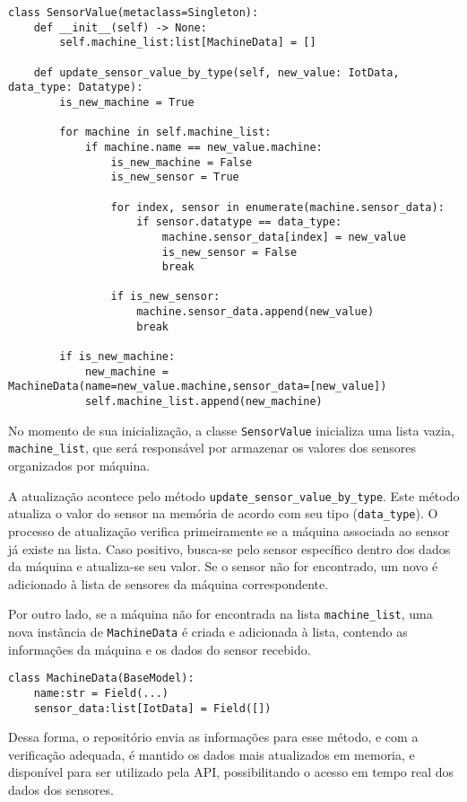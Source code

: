 \begin{verbatim}
class SensorValue(metaclass=Singleton):
    def __init__(self) -> None:
        self.machine_list:list[MachineData] = []

    def update_sensor_value_by_type(self, new_value: IotData, data_type: Datatype):
        is_new_machine = True

        for machine in self.machine_list:
            if machine.name == new_value.machine:
                is_new_machine = False
                is_new_sensor = True

                for index, sensor in enumerate(machine.sensor_data):
                    if sensor.datatype == data_type:
                        machine.sensor_data[index] = new_value
                        is_new_sensor = False
                        break

                if is_new_sensor:
                    machine.sensor_data.append(new_value)
                    break

        if is_new_machine:
            new_machine = MachineData(name=new_value.machine,sensor_data=[new_value])
            self.machine_list.append(new_machine)
\end{verbatim}

No momento de sua inicialização, a classe \texttt{SensorValue} inicializa uma lista vazia, \texttt{machine\_list}, que será responsável por armazenar os valores dos sensores organizados por máquina.

A atualização acontece pelo método \texttt{update\_sensor\_value\_by\_type}. Este método atualiza o valor do sensor na memória de acordo com seu tipo (\texttt{data\_type}). O processo de atualização verifica primeiramente se a máquina associada ao sensor já existe na lista. Caso positivo, busca-se pelo sensor específico dentro dos dados da máquina e atualiza-se seu valor. Se o sensor não for encontrado, um novo é adicionado à lista de sensores da máquina correspondente.

Por outro lado, se a máquina não for encontrada na lista \texttt{machine\_list}, uma nova instância de \texttt{MachineData} é criada e adicionada à lista, contendo as informações da máquina e os dados do sensor recebido.

\begin{verbatim}
class MachineData(BaseModel):
    name:str = Field(...)
    sensor_data:list[IotData] = Field([])
\end{verbatim}

Dessa forma, o repositório envia as informações para esse método, e com a verificação adequada, é mantido os dados mais atualizados em memoria, e disponível para ser utilizado pela API, possibilitando o acesso em tempo real dos dados dos sensores.


